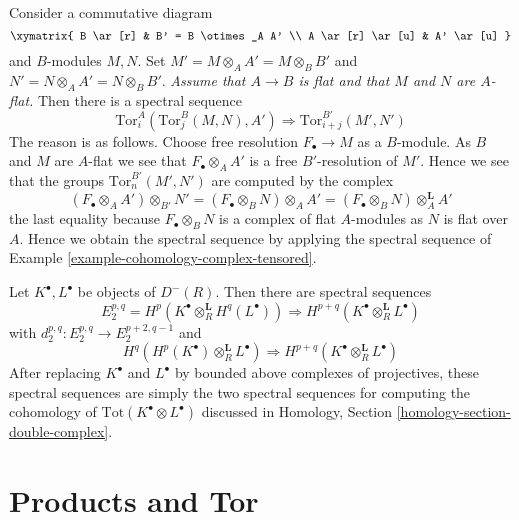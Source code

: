 \begin{example}
\label{example-tor-base-change}
Consider a commutative diagram
$$
\xymatrix{
B \ar[r] & B' = B \otimes_A A' \\
A \ar[r] \ar[u] & A' \ar[u]
}
$$
and $B$-modules $M, N$. Set $M' = M \otimes_A A' = M \otimes_B B'$
and $N' = N \otimes_A A' = N \otimes_B B'$.
{\it Assume that $A \to B$ is flat and that $M$ and $N$ are $A$-flat.}
Then there is a spectral sequence
$$
\text{Tor}^A_i(\text{Tor}_j^B(M, N), A')
\Rightarrow
\text{Tor}^{B'}_{i + j}(M', N')
$$
The reason is as follows. Choose free resolution
$F_\bullet \to M$ as a $B$-module. As $B$ and $M$ are $A$-flat we see
that $F_\bullet \otimes_A A'$ is a free $B'$-resolution of $M'$.
Hence we see that the groups $\text{Tor}^{B'}_n(M', N')$ are
computed by the complex
$$
(F_\bullet \otimes_A A') \otimes_{B'} N' =
(F_\bullet \otimes_B N) \otimes_A A' =
(F_\bullet \otimes_B N) \otimes^{\mathbf{L}}_A A'
$$
the last equality because $F_\bullet \otimes_B N$ is a complex
of flat $A$-modules as $N$ is flat over $A$. Hence we obtain the
spectral sequence by applying the spectral sequence of
Example \ref{example-cohomology-complex-tensored}.
\end{example}

\begin{example}
\label{example-tor}
Let $K^\bullet, L^\bullet$ be objects of $D^{-}(R)$.
Then there are spectral sequences
$$
E_2^{p, q} = H^p(K^\bullet \otimes_R^{\mathbf{L}} H^q(L^\bullet))
\Rightarrow H^{p + q}(K^\bullet \otimes_R^{\mathbf{L}} L^\bullet)
$$
with $d_2^{p, q} : E_2^{p, q} \to E_2^{p + 2, q - 1}$
and
$$
H^q(H^p(K^\bullet) \otimes_R^{\mathbf{L}} L^\bullet)
\Rightarrow H^{p + q}(K^\bullet \otimes_R^{\mathbf{L}} L^\bullet)
$$
After replacing $K^\bullet$ and $L^\bullet$ by bounded above complexes
of projectives, these spectral sequences are simply the two spectral
sequences for computing the cohomology of
$\text{Tot}(K^\bullet \otimes L^\bullet)$ discussed in
Homology, Section \ref{homology-section-double-complex}.
\end{example}









\section{Products and Tor}
\label{section-products-tor}

